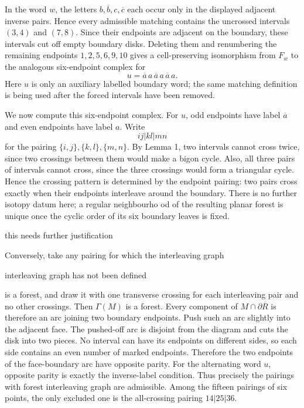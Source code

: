 \documentclass[12pt]{article}
\newcommand{\ol}{\overline}
\newcommand{\review}[1]{\begin{reviewbox}#1\end{reviewbox}}
\begin{document}
In the word \(w\), the letters \(b,\ol b,c,\ol c\) each occur only in
the displayed adjacent inverse pairs.  Hence every admissible matching
contains the uncrossed intervals \((3,4)\) and \((7,8)\).  Since their
endpoints are adjacent on the boundary, these intervals cut off empty
boundary disks.  Deleting them and renumbering the remaining endpoints
\(1,2,5,6,9,10\) gives a cell-preserving isomorphism from \(F_w\) to the
analogous six-endpoint complex for
\[
        u=\ol a\,a\,\ol a\,a\,\ol a\,a .
\]
Here \(u\) is only an auxiliary labelled boundary word; the same matching
definition is being used after the forced intervals have been removed.

We now compute this six-endpoint complex.  For \(u\), odd endpoints have
label \(\ol a\) and even endpoints have label \(a\).  Write
\[
        ij|kl|mn
\]
for the pairing \(\{i,j\},\{k,l\},\{m,n\}\).  By Lemma 1, two intervals
cannot cross twice, since two crossings between them would make a bigon
cycle.  Also, all three pairs of intervals cannot cross, since the
three crossings would form a triangular cycle.  Hence the crossing
pattern is determined by the endpoint pairing: two pairs cross exactly
when their endpoints interleave around the boundary.  There is no
further isotopy datum here; a regular neighbourho
od of the resulting
planar forest is unique once the cyclic order of its six boundary leaves
is fixed.\review{this needs further justification}

Conversely, take any pairing for which the interleaving graph\review{interleaving graph has not been defined} is a
forest, and draw it with one transverse crossing for each interleaving
pair and no other crossings.  Then \(\Gamma(M)\) is a forest.  Every
component of \(M\cap\partial\overline R\) is therefore an arc joining
two boundary endpoints.  Push such an arc slightly into the adjacent
face.  The pushed-off arc is disjoint from the diagram and cuts the disk
into two pieces.  No interval can have its endpoints on different sides,
so each side contains an even number of marked endpoints.  Therefore
the two endpoints of the face-boundary arc have opposite parity.  For
the alternating word \(u\), opposite parity is exactly the inverse-label
condition.  Thus precisely the pairings with forest interleaving graph
are admissible.  Among the fifteen pairings of six points, the only
excluded one is the all-crossing pairing \(14|25|36\).
\end{document}
